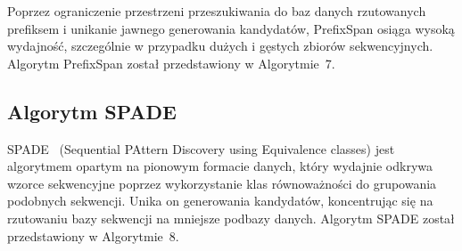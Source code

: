 Poprzez ograniczenie przestrzeni przeszukiwania do baz danych rzutowanych prefiksem i unikanie jawnego generowania kandydatów, PrefixSpan osiąga wysoką wydajność, szczególnie w przypadku dużych i gęstych zbiorów sekwencyjnych. Algorytm PrefixSpan został przedstawiony w Algorytmie~7.


\begin{algorithm}[!htb]
\LinesNumbered
{}

\BlankLine


\caption{\textbf{PrefixSpan} algorithm (Prefix-projected Sequential Pattern Mining)}
\label{alg:prefixspan}
\end{algorithm}


\subsection{Algorytm SPADE}
SPADE~\cite{zaki2001spade} (Sequential PAttern Discovery using Equivalence classes) jest algorytmem opartym na pionowym formacie danych, który wydajnie odkrywa wzorce sekwencyjne poprzez wykorzystanie klas równoważności do grupowania podobnych sekwencji. Unika on generowania kandydatów, koncentrując się na rzutowaniu bazy sekwencji na mniejsze podbazy danych. Algorytm SPADE został przedstawiony w Algorytmie~8.


